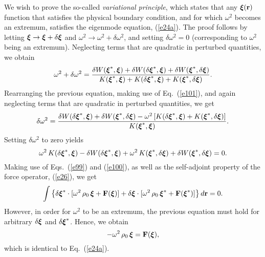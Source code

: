\documentclass[12pt,prb,aps,notitlepage]{revtex4-1}
\newcommand{\bxi}{\mbox{\boldmath$\xi$}}
\begin{document}
We wish to prove the so-called {\em variational principle}, which states that any  $\bxi({\bf r})$ function that satisfies the physical boundary condition, and for which $\omega^2$ becomes an extremum, satisfies the eigenmode equation, (\ref{e24a}). The proof follows by letting $\bxi\rightarrow \bxi + \delta\bxi$ and $\omega^2\rightarrow \omega^2+\delta\omega^2$,
and setting $\delta\omega^2=0$ (corresponding to $\omega^2$ being an extremum). 
Neglecting terms that are quadratic in perturbed quantities, we obtain
\begin{equation}
\omega^2+\delta\omega^2= \frac{\delta W(\bxi^\ast,\bxi)+\delta W(\delta\bxi^\ast,\bxi)+\delta W(\bxi^\ast,\delta\bxi)}
{K(\bxi^\ast,\bxi)+K(\delta\bxi^\ast,\bxi)+K(\bxi^\ast,\delta\bxi)}.
\end{equation}
Rearranging the previous equation, making use of Eq.~(\ref{e101}), and again neglecting terms that are quadratic in perturbed quantities,
we get
\begin{equation}
\delta \omega^2 = \frac{\delta W(\delta\bxi^\ast,\bxi)+\delta W(\bxi^\ast,\delta\bxi)-\omega^2\,[K(\delta\bxi^\ast,\bxi)+K(\bxi^\ast,\delta\bxi)]}
{K(\bxi^\ast,\bxi)}. 
\end{equation}
Setting $\delta\omega^2$ to zero yields
\begin{equation}
\omega^2\,K(\delta\bxi^\ast,\bxi)-\delta W(\delta\bxi^\ast,\bxi) + \omega^2\,K(\bxi^\ast,\delta\bxi) + \delta W(\bxi^\ast,\delta\bxi)=0.
\end{equation}
Making use of Eqs.~(\ref{e99}) and (\ref{e100}), as well as the self-adjoint property of the force operator, (\ref{e26}), we get
\begin{equation}
\int \left\{\delta\bxi^\ast\cdot[\omega^2\,\rho_0\,\bxi+{\bf F}(\bxi)]+ \delta\bxi\cdot[\omega^2\,\rho_0\,\bxi^\ast + {\bf F}(\bxi^\ast)]\right\}d{\bf r} = 0.
\end{equation}
However, in order for $\omega^2$ to be an extremum, the previous equation must hold for arbitrary $\delta\bxi$ and $\delta\bxi^\ast$. Hence, 
we obtain
\begin{equation}
-\omega^2\,\rho_0\,\bxi = {\bf F}(\bxi),
\end{equation}
which is identical to Eq.~(\ref{e24a}). 
\end{document}
